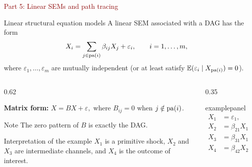 \documentclass[dvipsnames,aspectratio=169,handout]{beamer}
\begin{document}
\begin{frame}{}
\begin{center}
{\Huge \textcolor{DarkRed}{Part 5: Linear SEMs and path tracing}}
\end{center}
\end{frame}

\begin{frame}{Linear structural equation models}
A linear SEM associated with a DAG has the form
\[
X_i = \sum_{j\in \operatorname{pa}(i)} \beta_{ij} X_j + \varepsilon_i,
\qquad i=1,\ldots,m,
\]
where $\varepsilon_1,\ldots,\varepsilon_m$ are mutually independent
(or at least satisfy $\mathbb{E}(\varepsilon_i\mid X_{\operatorname{pa}(i)})=0$).

\begin{columns}[T]
\begin{column}{0.62\textwidth}
\begin{block}{}
\textbf{Matrix form:}
$
X = BX + \varepsilon,
$
where
$
B_{ij}=0 $ when  $j\notin \operatorname{pa}(i)$.
\end{block}\vspace{-2mm}

\begin{alertblock}{Note}
The zero pattern of $B$ is exactly the DAG.
\end{alertblock}\vspace{9mm}

\begin{alertblock}{Interpretation of the example}
$X_1$ is a primitive shock, $X_2$ and $X_3$ are intermediate channels,
and $X_4$ is the outcome of interest.
\end{alertblock}
\end{column}

\begin{column}{0.35\textwidth}
\begin{beamercolorbox}[wd=\textwidth,sep=0pt]{examplepanel}
\[
\begin{aligned}
X_1 &= \varepsilon_1,\\
X_2 &= \beta_{21}X_1+\varepsilon_2,\\
X_3 &= \beta_{31}X_1+\varepsilon_3,\\
X_4 &= \beta_{42}X_2+\beta_{43}X_3+\varepsilon_4.
\end{aligned}
\]

\vspace{-6mm}
\begin{center}
\end{center}
\end{beamercolorbox}
\end{column}
\end{columns}
\end{frame}
\end{document}
